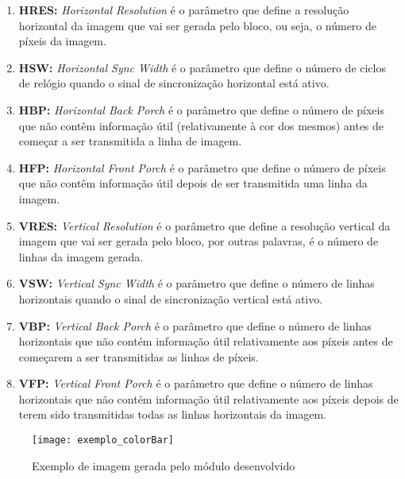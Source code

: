 \begin{enumerate}
	\item \textbf{HRES:} \textit{Horizontal Resolution} é o parâmetro que define a resolução horizontal da imagem que vai ser gerada pelo bloco, ou seja, o número de píxeis da imagem.
	
	\item \textbf{HSW:} \textit{Horizontal Sync Width} é o parâmetro que define o número de ciclos de relógio quando o sinal de sincronização horizontal  está ativo.
	
	\item \textbf{HBP:} \textit{Horizontal Back Porch} é o parâmetro que define o número de píxeis que não contêm informação útil (relativamente à cor dos mesmos) antes de começar a ser transmitida a linha de imagem.
	
	\item \textbf{HFP:} \textit{Horizontal Front Porch} é o parâmetro que define o número de píxeis que não contêm informação útil depois de ser transmitida uma linha da imagem.
	
	\item \textbf{VRES:} \textit{Vertical Resolution} é o parâmetro que define a resolução vertical da imagem que vai ser gerada pelo bloco, por outras palavras, é o número de linhas da imagem gerada.
	
	\item \textbf{VSW:} \textit{Vertical Sync Width} é o parâmetro que define o número de linhas horizontais quando o sinal de sincronização vertical está ativo.
	
	\item \textbf{VBP:} \textit{Vertical Back Porch} é o parâmetro que define o número de linhas horizontais que não contém informação útil relativamente aos píxeis antes de começarem a ser transmitidas as linhas de píxeis.
	
	\item \textbf{VFP:} \textit{Vertical Front Porch} é o parâmetro que define o número de linhas horizontais que não contém informação útil relativamente aos píxeis depois de terem sido transmitidas todas as linhas horizontais da imagem.
\end{enumerate}
	
\begin{figure}[h!]
	\begin{center}
		\leavevmode
		\texttt{[image: exemplo\_colorBar]}
		\caption{Exemplo de imagem gerada pelo módulo desenvolvido}
		\label{fig:colorBar_exemple}
	\end{center}
\end{figure}

